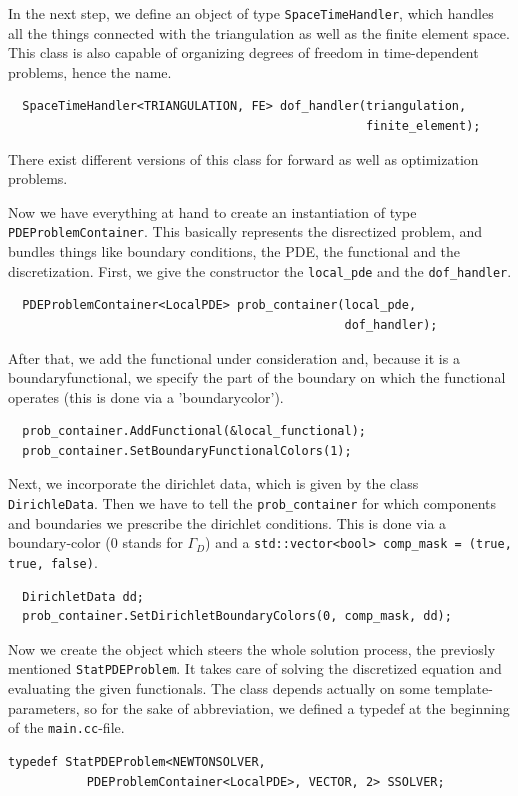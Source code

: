 \documentclass[prodmode,acmtoms]{acmsmall}
\numberwithin{equation}{section}
\begin{document}
In the next step, we define an object of type \texttt{SpaceTimeHandler}, which handles all the things connected with the triangulation as well as the finite element space. This class is also capable of organizing degrees of freedom in time-dependent problems, hence the name. 
\begin{lstlisting}
  SpaceTimeHandler<TRIANGULATION, FE> dof_handler(triangulation,
                                                  finite_element);
\end{lstlisting}
There exist different versions of this class for forward as well as optimization problems. 

Now we have everything at hand to create an instantiation of type \texttt{PDEProblemContainer}. This basically represents the disrectized problem, and bundles things like boundary conditions, the PDE, the functional and the discretization. First, we give the constructor the \texttt{local\_pde} and the \texttt{dof\_handler}.
\begin{lstlisting}
  PDEProblemContainer<LocalPDE> prob_container(local_pde,
                                               dof_handler);
\end{lstlisting}
After that, we add the functional under consideration and, because it is a boundaryfunctional, we specify the part of the boundary on which the functional operates (this is done via a 'boundarycolor').
\begin{lstlisting}
  prob_container.AddFunctional(&local_functional);
  prob_container.SetBoundaryFunctionalColors(1);
\end{lstlisting}
Next, we incorporate the dirichlet data, which is given by the class \texttt{DirichleData}. Then we have to tell the \texttt{prob\_container} for which components and boundaries we prescribe the dirichlet conditions. This is done via a boundary-color (0 stands for $\Gamma_D$) and a \texttt{std::vector<bool> comp\_mask = (true, true, false)}.
\begin{lstlisting}
  DirichletData dd;
  prob_container.SetDirichletBoundaryColors(0, comp_mask, dd);
\end{lstlisting}
Now we create the object which steers the whole solution process, the previosly mentioned \texttt{StatPDEProblem}. It takes care of solving the discretized equation and evaluating the given functionals. The class depends actually on some template-parameters, so for the sake of abbreviation, we defined a typedef at the beginning of the \texttt{main.cc}-file.
\begin{lstlisting}
typedef StatPDEProblem<NEWTONSOLVER,
           PDEProblemContainer<LocalPDE>, VECTOR, 2> SSOLVER;
\end{lstlisting}
\end{document}
